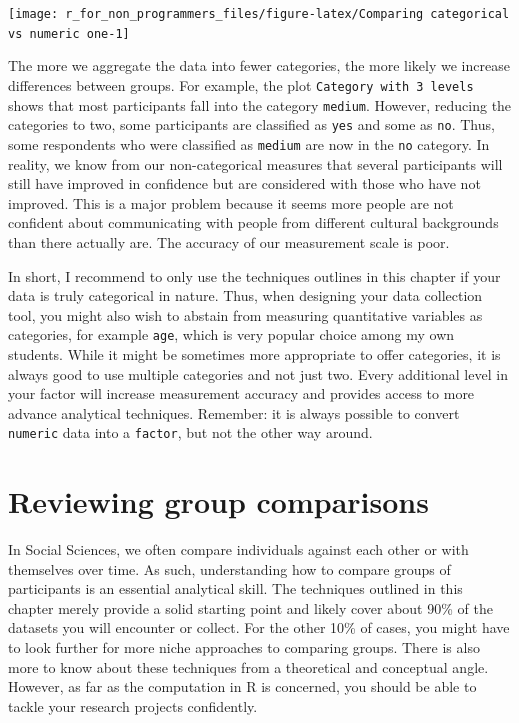 \documentclass[
]{book}
\begin{document}
\begin{center}\texttt{[image: r\_for\_non\_programmers\_files/figure-latex/Comparing categorical vs numeric one-1]} \end{center}

The more we aggregate the data into fewer categories, the more likely we increase differences between groups. For example, the plot \texttt{Category\ with\ 3\ levels} shows that most participants fall into the category \texttt{medium}. However, reducing the categories to two, some participants are classified as \texttt{yes} and some as \texttt{no}. Thus, some respondents who were classified as \texttt{medium} are now in the \texttt{no} category. In reality, we know from our non-categorical measures that several participants will still have improved in confidence but are considered with those who have not improved. This is a major problem because it seems more people are not confident about communicating with people from different cultural backgrounds than there actually are. The accuracy of our measurement scale is poor.

In short, I recommend to only use the techniques outlines in this chapter if your data is truly categorical in nature. Thus, when designing your data collection tool, you might also wish to abstain from measuring quantitative variables as categories, for example \texttt{age}, which is very popular choice among my own students. While it might be sometimes more appropriate to offer categories, it is always good to use multiple categories and not just two. Every additional level in your factor will increase measurement accuracy and provides access to more advance analytical techniques. Remember: it is always possible to convert \texttt{numeric} data into a \texttt{factor}, but not the other way around.

\hypertarget{reviewing-group-comparisons}{%
\section{Reviewing group comparisons}\label{reviewing-group-comparisons}}

In Social Sciences, we often compare individuals against each other or with themselves over time. As such, understanding how to compare groups of participants is an essential analytical skill. The techniques outlined in this chapter merely provide a solid starting point and likely cover about 90\% of the datasets you will encounter or collect. For the other 10\% of cases, you might have to look further for more niche approaches to comparing groups. There is also more to know about these techniques from a theoretical and conceptual angle. However, as far as the computation in R is concerned, you should be able to tackle your research projects confidently.
\end{document}
